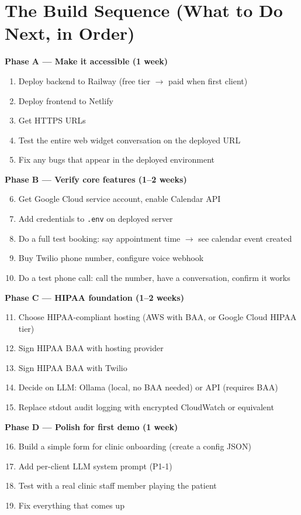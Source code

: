 \documentclass[12pt, a4paper]{report}
\newcommand{\ic}[1]{\texttt{\small\color{accentblue!70!black}#1}}
\begin{document}
\section{The Build Sequence (What to Do Next, in Order)}

\textbf{Phase A --- Make it accessible (1 week)}
\begin{enumerate}
  \item Deploy backend to Railway (free tier $\to$ paid when first client)
  \item Deploy frontend to Netlify
  \item Get HTTPS URLs
  \item Test the entire web widget conversation on the deployed URL
  \item Fix any bugs that appear in the deployed environment
\end{enumerate}

\textbf{Phase B --- Verify core features (1--2 weeks)}
\begin{enumerate}
  \setcounter{enumi}{5}
  \item Get Google Cloud service account, enable Calendar API
  \item Add credentials to \ic{.env} on deployed server
  \item Do a full test booking: say appointment time $\to$ see calendar event created
  \item Buy Twilio phone number, configure voice webhook
  \item Do a test phone call: call the number, have a conversation, confirm it works
\end{enumerate}

\textbf{Phase C --- HIPAA foundation (1--2 weeks)}
\begin{enumerate}
  \setcounter{enumi}{10}
  \item Choose HIPAA-compliant hosting (AWS with BAA, or Google Cloud HIPAA tier)
  \item Sign HIPAA BAA with hosting provider
  \item Sign HIPAA BAA with Twilio
  \item Decide on LLM: Ollama (local, no BAA needed) or API (requires BAA)
  \item Replace stdout audit logging with encrypted CloudWatch or equivalent
\end{enumerate}

\textbf{Phase D --- Polish for first demo (1 week)}
\begin{enumerate}
  \setcounter{enumi}{15}
  \item Build a simple form for clinic onboarding (create a config JSON)
  \item Add per-client LLM system prompt (P1-1)
  \item Test with a real clinic staff member playing the patient
  \item Fix everything that comes up
\end{enumerate}
\end{document}
